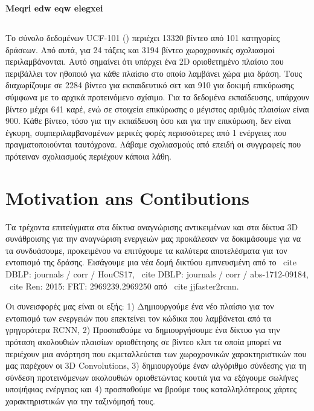 \textbf{Meqri edw eqw elegxei}
\subsection{}
Το σύνολο δεδομένων \en UCF-101 (\cite{soomro2012ucf101}) \gr περιέχει 13320 βίντεο από 101 κατηγορίες δράσεων.
Από αυτά, για 24 τάξεις και 3194 βίντεο χωροχρονικές σχολιασμοί περιλαμβάνονται. Αυτό σημαίνει ότι υπάρχει ένα 2D οριοθετημένο πλαίσιο που περιβάλλει τον ηθοποιό για κάθε πλαίσιο στο οποίο λαμβάνει χώρα μια δράση.
Τους διαχωρίζουμε σε 2284 βίντεο για εκπαιδευτικό σετ και 910 για δοκιμή επικύρωσης σύμφωνα με το
αρχικά προτεινόμενο σχίσιμο. Για τα δεδομένα εκπαίδευσης, υπάρχουν βίντεο μέχρι 641 καρέ, ενώ σε στοιχεία επικύρωσης ο μέγιστος αριθμός πλαισίων είναι 900.
Κάθε βίντεο, τόσο για την εκπαίδευση όσο και για την επικύρωση, δεν είναι έγκυρη, συμπεριλαμβανομένων μερικές φορές περισσότερες από 1 ενέργειες που πραγματοποιούνται ταυτόχρονα.
Λάβαμε σχολιασμούς από \en \cite{singh2016online} \gr επειδή οι συγγραφείς που πρότειναν σχολιασμούς περιέχουν κάποια λάθη.

\section{Motivation ans Contibutions}
Τα τρέχοντα επιτεύγματα στα δίκτυα αναγνώρισης αντικειμένων και στα δίκτυα 3D συνάθροισης για την αναγνώριση ενεργειών μας προκάλεσαν να δοκιμάσουμε
για να τα συνδυάσουμε, προκειμένου να επιτύχουμε τα καλύτερα αποτελέσματα για τον εντοπισμό της δράσης. Εισάγουμε μια νέα δομή δικτύου εμπνευσμένη από το
\ cite {DBLP: journals / corr / HouCS17}, \ cite {DBLP: journals / corr / abs-1712-09184}, \ cite {Ren: 2015: FRT: 2969239.2969250}
από \ cite {jjfaster2rcnn}.

Οι συνεισφορές μας είναι οι εξής: 1) Δημιουργούμε ένα νέο πλαίσιο για τον εντοπισμό των ενεργειών που επεκτείνει τον κώδικα που λαμβάνεται από τα γρηγορότερα RCNN,
2) Προσπαθούμε να δημιουργήσουμε ένα δίκτυο για την πρόταση ακολουθιών πλαισίων οριοθέτησης σε βίντεο κλιπ τα οποία μπορεί να περιέχουν μια ανάρτηση που εκμεταλλεύεται
των χωροχρονικών χαρακτηριστικών που μας παρέχουν οι 3D Convolutions, 3) δημιουργούμε έναν αλγόριθμο σύνδεσης για τη σύνδεση προτεινόμενων ακολουθιών
οριοθετώντας κουτιά για να εξάγουμε σωλήνες υποψήφιας ενέργειας και 4) προσπαθούμε να βρούμε τους καταλληλότερους χάρτες χαρακτηριστικών για την ταξινόμησή τους.
